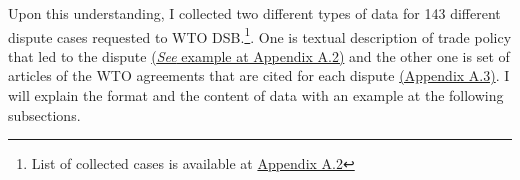 \noindent Upon this understanding, 
I collected two different types of data for 143 different dispute cases requested to WTO DSB.\footnote{List of collected cases is
    available at \hyperref[sub:cited-articles-table]{Appendix A.2}
}.
One is textual description of trade policy
that led to the dispute \hyperref[sub:factual-aspect-example]{(\textit{See} example at Appendix A.2)} and the other one is
set of articles of the WTO agreements that are
cited for each dispute \hyperref[sub:cited-articles-table]{(Appendix A.3)}.
I will explain the format and the content of
data with an example at the following subsections.













